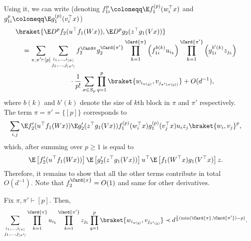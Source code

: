 Using it, we can write (denoting \(f_{1i}^p \coloneqq \E f_1^{(p)}(w_i^\top x)\) and \(g_{1i}^p \coloneqq \E g_1^{(p)}(v_i^\top x)\))
\begin{equation}
\begin{aligned}
    & \braket{\E D^p f_2(u^{\top} f_1(Wx)), \E D^p g_2(z^{\top} g_1(Vx))} \\
    & \quad = \sum_{\substack{\pi, \pi' \vdash [p]}} \sum_{\substack{i_1, \ldots, i_{\lvert \pi \rvert} \\
    j_1, \ldots, j_{\rvert \pi' \rvert}}} f_2^{\Card \pi} g_2^{\Card {\pi'}} \prod_{k = 1}^{\Card{\pi}} \left( f_{1i}^{b(k)} u_{i_k} \right) \prod_{k = 1}^{\Card{\pi'}} \left( g_{1i}^{b'(k)} z_{j_k} \right) \\
    &\qquad \qquad \qquad \qquad \cdot \frac{1}{p!} \sum_{\sigma \in S_p} \prod_{q=1}^p \braket{w_{i_{\pi(q)}}, v_{j_{\pi'(\sigma(q))}}} + O(d^{-1}),
\end{aligned}
\end{equation}
where \(b(k)\) and \(b'(k)\) denote the size of \(k\)th block in \(\pi\) and \(\pi'\) respectively.
The term \(\pi = \pi' = \{[p]\}\) corresponds to 
\begin{equation}
    \sum_{i, j} \E f_2' (u^\top f_1(Wx)) \E g_2'(z^\top g_1(Vx)) f_1^{(p)}(w_i^\top x)g_1^{(p)}(v_j^\top x)u_i z_j \braket{w_{i}, v_{j}}^p,
\end{equation}
which, after summing over \(p \geq 1\) is equal to
\begin{equation}
    \E \left[f_2' (u^\top f_1(Wx))\right] \E \left[g_2' (z^\top g_1(Vx))\right] u^\top \E \left[f_1(W^\top x)g_1(V^\top x)\right]z.
\end{equation}
Therefore, it remains to show that all the other terms contribute in total \(O(d^{-1})\). Note that \(f_2^{\Card{\pi}} = O(1)\) and same for other derivatives.
\begin{lemma}
    Fix \(\pi, \pi' \vdash [p]\). Then,
    \begin{equation}
       \sum_{\substack{i_1, \ldots, i_{\lvert \pi \rvert} \\
    j_1, \ldots, j_{\rvert \pi' \rvert}}}  \prod_{k = 1}^{\Card{\pi}}  u_{i_k} \prod_{k = 1}^{\Card{\pi'}}  z_{j_k} \prod_{q=1}^p \braket{w_{i_{\pi(q)}}, v_{j_{\pi'(q)}}} \prec d^{\frac{1}{2}(\min(\Card{\pi}, \Card{\pi'}) - p)}.
    \end{equation}
    
\end{lemma}
